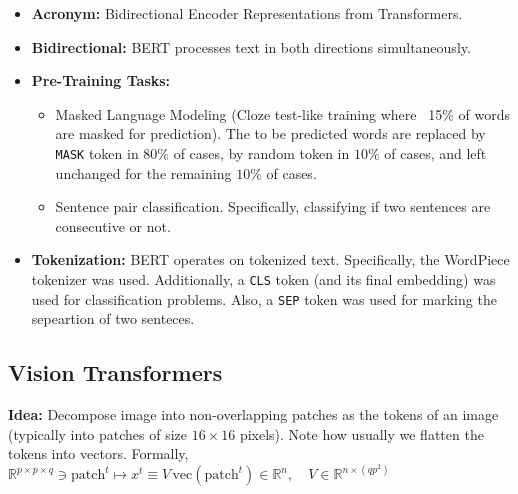  
\begin{itemize}
    \item \textbf{Acronym:} Bidirectional Encoder Representations from Transformers.
    \item \textbf{Bidirectional:} BERT processes text in both directions simultaneously.
    \item \textbf{Pre-Training Tasks:} 
        \begin{itemize}
            \item Masked Language Modeling (Cloze test-like training where ~15\% of words are masked for prediction). The to be predicted words are replaced by \texttt{MASK} token in $80\%$ of cases, by random token in $10\%$ of cases, and left unchanged for the remaining $10\%$ of cases.
            \item Sentence pair classification. Specifically, classifying if two sentences are consecutive or not. 
        \end{itemize}
    \item \textbf{Tokenization:} BERT operates on tokenized text. Specifically, the WordPiece tokenizer was used. Additionally, a \texttt{CLS} token (and its final embedding) was used for classification problems. Also, a \texttt{SEP} token was used for marking the sepeartion of two senteces. 
\end{itemize}


\subsection{Vision Transformers}

\textbf{Idea:} Decompose image into non-overlapping patches as the tokens of an image (typically into patches of size $16 \times 16$ pixels). Note how usually we flatten the tokens into vectors. Formally, \\$\mathbb{R}^{p \times p \times q} \ni \text{patch}^t \mapsto x^t \equiv V \, \text{vec}(\text{patch}^t) \in \mathbb{R}^n, \quad V \in \mathbb{R}^{n \times (qp^2)}$ 


